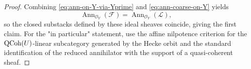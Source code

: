 \begin{proof}
Combining \eqref{eq:ann-on-Y-via-Yprime} and \eqref{eq:ann-coarse-on-Y} yields
\[
\operatorname{Ann}_{\mathcal O_Y}(\mathcal F)=\operatorname{Ann}_{\mathcal O_Y}(\mathcal L),
\]
so the closed substacks defined by these ideal sheaves coincide, giving the first claim. For the "in particular" statement, use the affine nilpotence criterion for the $\mathrm{QCoh}(U)$-linear subcategory generated by the Hecke orbit and the standard identification of the reduced annihilator with the support of a quasi-coherent sheaf.
\end{proof}

